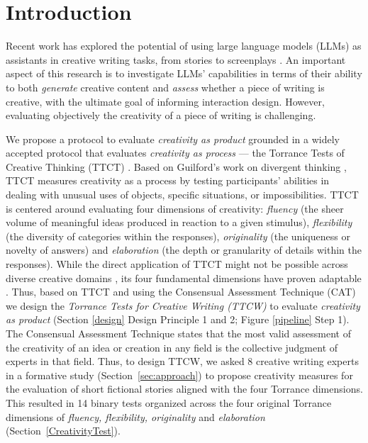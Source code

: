 \section{Introduction}
\label{sec:intro}


Recent work has explored the potential of using large language models (LLMs) as assistants in creative writing tasks, from stories to screenplays 
\cite{mirowski2023cowriting,yang2022re3,lee2022coauthor,ippolito2022creative,chen2023ambient}. An important aspect of this research is to investigate LLMs’ capabilities in terms of their ability to both \textit{generate} creative content and \textit{assess} whether a piece of writing is creative, with the ultimate goal of informing interaction design. However, evaluating objectively the creativity of a piece of writing is challenging. 

We propose a protocol to evaluate \textit{creativity as product} grounded in a widely accepted protocol that evaluates \textit{creativity as process} --- the Torrance Tests of Creative Thinking (TTCT) \cite{torrance1966torrance}. Based on Guilford's work on divergent thinking \cite{guilford1967nature}, TTCT measures creativity as a process by testing participants’ abilities in dealing with unusual uses of objects, specific situations, or impossibilities. TTCT is centered around evaluating four dimensions of creativity: \textit{fluency} (the sheer volume of meaningful ideas produced in reaction to a given stimulus), \textit{flexibility} (the diversity of categories within the responses), \textit{originality} (the uniqueness or novelty of answers) and \textit{elaboration} (the depth or granularity of details within the responses). 
While the direct application of TTCT might not be possible across diverse creative domains \cite{amabile1982social,baer2009assessing}, its four fundamental dimensions have proven adaptable \cite{trisnayanti2019development,mcintyre2003individual,10.1145/3313831.3376495}. Thus, based on TTCT and using the Consensual Assessment Technique (CAT) \cite{amabile1982social} we design the \textit{Torrance Tests for Creative Writing (TTCW)} to evaluate \textit{creativity as product} (Section \ref{design} Design Principle 1 and 2; Figure \ref{pipeline} Step 1). %
The Consensual Assessment Technique states that the most valid assessment of the creativity of an idea or creation in any field is the collective judgment of experts in that field. Thus, to design TTCW, we asked 8 creative writing experts in a formative study (Section~\ref{sec:approach}) to propose creativity measures for the evaluation of short fictional stories aligned with the four Torrance dimensions. This resulted in 14 binary tests organized across the four original Torrance dimensions of \textit{fluency, flexibility, originality} and \textit{elaboration} (Section~\ref{CreativityTest}). 

